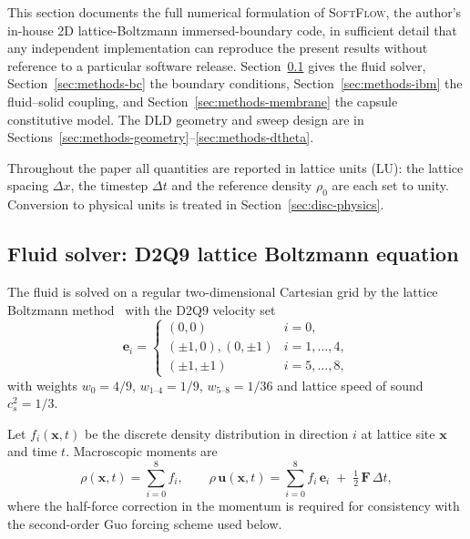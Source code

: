 \documentclass[11pt,a4paper]{article}
\begin{document}
This section documents the full numerical formulation of
\textsc{SoftFlow}, the author's in-house 2D lattice-Boltzmann
immersed-boundary code, in sufficient detail that any independent
implementation can reproduce the present results without
reference to a particular software release. Section~\ref{sec:methods-lbm}
gives the fluid solver, Section~\ref{sec:methods-bc} the boundary
conditions, Section~\ref{sec:methods-ibm} the fluid--solid coupling,
and Section~\ref{sec:methods-membrane} the capsule constitutive
model. The DLD geometry and sweep design are in
Sections~\ref{sec:methods-geometry}--\ref{sec:methods-dtheta}.

Throughout the paper all quantities are reported in lattice units
(LU): the lattice spacing $\Delta x$, the timestep $\Delta t$ and
the reference density $\rho_0$ are each set to unity. Conversion to
physical units is treated in Section~\ref{sec:disc-physics}.

\subsection{Fluid solver: D2Q9 lattice Boltzmann equation}
\label{sec:methods-lbm}

The fluid is solved on a regular two-dimensional Cartesian grid by
the lattice Boltzmann method~\citep{kruger2017lattice} with the
D2Q9 velocity set
\begin{equation}
\boldsymbol e_i =
\begin{cases}
(0,0)                 & i = 0,\\
(\pm 1, 0),(0,\pm 1)  & i = 1,\dots,4,\\
(\pm 1, \pm 1)        & i = 5,\dots,8,
\end{cases}
\label{eq:d2q9}
\end{equation}
with weights $w_0 = 4/9$, $w_{1\text{--}4} = 1/9$,
$w_{5\text{--}8} = 1/36$ and lattice speed of sound
$c_s^2 = 1/3$.

Let $f_i(\boldsymbol x, t)$ be the discrete density distribution in
direction $i$ at lattice site $\boldsymbol x$ and time $t$.
Macroscopic moments are
\begin{equation}
\rho(\boldsymbol x, t) = \sum_{i=0}^{8} f_i,
\qquad
\rho\,\boldsymbol u(\boldsymbol x, t) =
   \sum_{i=0}^{8} f_i\,\boldsymbol e_i \;+\;
   \tfrac{1}{2}\,\boldsymbol F\,\Delta t,
\label{eq:moments}
\end{equation}
where the half-force correction in the momentum is required for
consistency with the second-order Guo forcing scheme used below.
\end{document}
